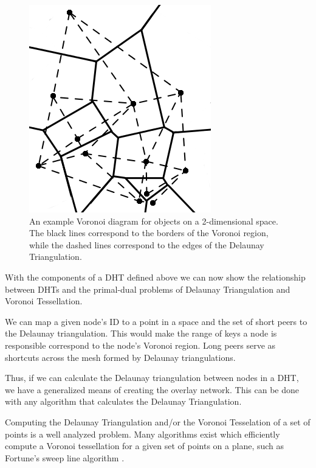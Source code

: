 \documentclass[11pt,conference]{IEEEtran}
\begin{document}
\begin{figure}
	\centering
	\includegraphics[width=0.75\linewidth]{voronoi}
	\caption{An example Voronoi diagram for objects on a 2-dimensional space.  The black lines correspond to the borders of the Voronoi region, while the dashed lines correspond to the edges of the Delaunay Triangulation.}
	\label{voro-ex}
\end{figure}


With the components of a DHT defined above we can now show the relationship between DHTs and the primal-dual problems of Delaunay Triangulation and Voronoi Tessellation.

We can map a given node's ID to a point in a space and the set of short peers to the Delaunay triangulation.
This would make the range of keys a node is responsible correspond to the node's Voronoi region.
Long peers serve as shortcuts across the mesh formed by Delaunay triangulations.


Thus, if we can calculate the Delaunay triangulation between nodes in a DHT, we have a generalized means of creating the overlay network.
This can be done with any algorithm that calculates the Delaunay Triangulation.

Computing the Delaunay Triangulation and/or the Voronoi Tesselation of a set of points is a well analyzed problem.
Many algorithms exist which efficiently compute a Voronoi tessellation for a given set of points on a plane, such as Fortune's sweep line algorithm \cite{fortune1987sweepline}.
\end{document}
